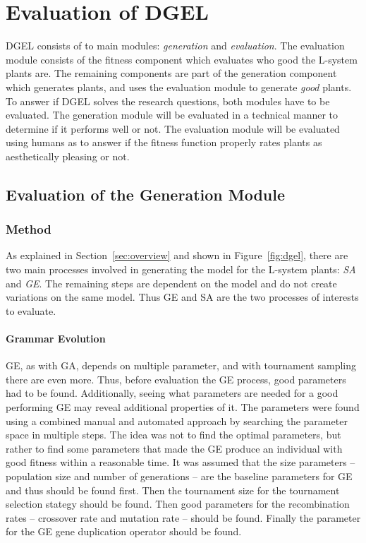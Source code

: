\chapter{Evaluation of DGEL}
DGEL consists of to main modules: \textit{generation} and \textit{evaluation}.
The evaluation module consists of the fitness component which evaluates who good the L-system plants are.
The remaining components are part of the generation component which generates plants, and uses the evaluation module to generate \textit{good} plants.
To answer if DGEL solves the research questions, both modules have to be evaluated.
The generation module will be evaluated in a technical manner to determine if it performs well or not.
The evaluation module will be evaluated using humans as to answer if the fitness function properly rates plants as aesthetically pleasing or not.

\section{Evaluation of the Generation Module}
\subsection{Method}
As explained in Section~\ref{sec:overview} and shown in Figure~\ref{fig:dgel}, there are two main processes involved in generating the model for the L-system plants: \textit{SA} and \textit{GE}.
The remaining steps are dependent on the model and do not create variations on the same model.
Thus GE and SA are the two processes of interests to evaluate.


\subsubsection{Grammar Evolution}
GE, as with GA, depends on multiple parameter, and with tournament sampling there are even more.
Thus, before evaluation the GE process, good parameters had to be found.
Additionally, seeing what parameters are needed for a good performing GE may reveal additional properties of it.
The parameters were found using a combined manual and automated approach by searching the parameter space in multiple steps.
The idea was not to find the optimal parameters, but rather to find some parameters that made the GE produce an individual with good fitness within a reasonable time.
It was assumed that the size parameters -- population size and number of generations -- are the baseline parameters for GE and thus should be found first.
Then the tournament size for the tournament selection stategy should be found.
Then good parameters for the recombination rates -- crossover rate and mutation rate -- should be found.
Finally the parameter for the GE gene duplication operator should be found.

